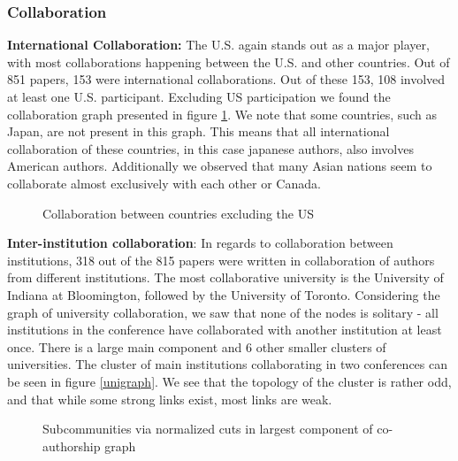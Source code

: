 \documentclass[article,twocolumn]{IEEEtran}
\begin{document}
    \hypertarget{collaboration}{%
\subsubsection{Collaboration}\label{collaboration}}

\textbf{International Collaboration:} The U.S. again stands out as a
major player, with most collaborations happening between the U.S. and
other countries. Out of 851 papers, 153 were international
collaborations. Out of these 153, 108 involved at least one U.S.
participant. Excluding US participation we found the collaboration graph
presented in figure \ref{figcollab}. We note that some countries, such
as Japan, are not present in this graph. This means that all
international collaboration of these countries, in this case japanese
authors, also involves American authors. Additionally we observed that
many Asian nations seem to collaborate almost exclusively with each
other or Canada.


    \begin{figure}
        \begin{center}\end{center}
        \caption{Collaboration between countries excluding the US}
        \label{figcollab}
    \end{figure}
    
    \textbf{Inter-institution collaboration}: In regards to collaboration
between institutions, 318 out of the 815 papers were written in
collaboration of authors from different institutions. The most
collaborative university is the University of Indiana at Bloomington,
followed by the University of Toronto. Considering the graph of
university collaboration, we saw that none of the nodes is solitary -
all institutions in the conference have collaborated with another
institution at least once. There is a large main component and 6 other
smaller clusters of universities. The cluster of main institutions
collaborating in two conferences can be seen in figure \ref{unigraph}.
We see that the topology of the cluster is rather odd, and that while
some strong links exist, most links are weak.


    \begin{figure}
        \begin{center}\end{center}
        \caption{Subcommunities via normalized cuts in largest component of co-authorship graph}
        \label{normalized}
    \end{figure}
    
\end{document}
